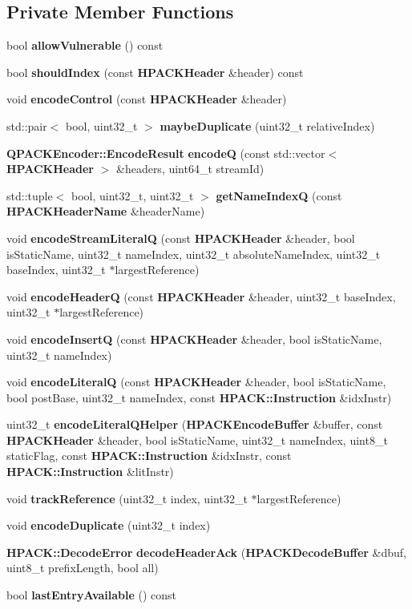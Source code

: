 \subsection*{Private Member Functions}
\begin{DoxyCompactItemize}
\item 
bool {\bf allow\+Vulnerable} () const 
\item 
bool {\bf should\+Index} (const {\bf H\+P\+A\+C\+K\+Header} \&header) const 
\item 
void {\bf encode\+Control} (const {\bf H\+P\+A\+C\+K\+Header} \&header)
\item 
std\+::pair$<$ bool, uint32\+\_\+t $>$ {\bf maybe\+Duplicate} (uint32\+\_\+t relative\+Index)
\item 
{\bf Q\+P\+A\+C\+K\+Encoder\+::\+Encode\+Result} {\bf encodeQ} (const std\+::vector$<$ {\bf H\+P\+A\+C\+K\+Header} $>$ \&headers, uint64\+\_\+t stream\+Id)
\item 
std\+::tuple$<$ bool, uint32\+\_\+t, uint32\+\_\+t $>$ {\bf get\+Name\+IndexQ} (const {\bf H\+P\+A\+C\+K\+Header\+Name} \&header\+Name)
\item 
void {\bf encode\+Stream\+LiteralQ} (const {\bf H\+P\+A\+C\+K\+Header} \&header, bool is\+Static\+Name, uint32\+\_\+t name\+Index, uint32\+\_\+t absolute\+Name\+Index, uint32\+\_\+t base\+Index, uint32\+\_\+t $\ast$largest\+Reference)
\item 
void {\bf encode\+HeaderQ} (const {\bf H\+P\+A\+C\+K\+Header} \&header, uint32\+\_\+t base\+Index, uint32\+\_\+t $\ast$largest\+Reference)
\item 
void {\bf encode\+InsertQ} (const {\bf H\+P\+A\+C\+K\+Header} \&header, bool is\+Static\+Name, uint32\+\_\+t name\+Index)
\item 
void {\bf encode\+LiteralQ} (const {\bf H\+P\+A\+C\+K\+Header} \&header, bool is\+Static\+Name, bool post\+Base, uint32\+\_\+t name\+Index, const {\bf H\+P\+A\+C\+K\+::\+Instruction} \&idx\+Instr)
\item 
uint32\+\_\+t {\bf encode\+Literal\+Q\+Helper} ({\bf H\+P\+A\+C\+K\+Encode\+Buffer} \&buffer, const {\bf H\+P\+A\+C\+K\+Header} \&header, bool is\+Static\+Name, uint32\+\_\+t name\+Index, uint8\+\_\+t static\+Flag, const {\bf H\+P\+A\+C\+K\+::\+Instruction} \&idx\+Instr, const {\bf H\+P\+A\+C\+K\+::\+Instruction} \&lit\+Instr)
\item 
void {\bf track\+Reference} (uint32\+\_\+t index, uint32\+\_\+t $\ast$largest\+Reference)
\item 
void {\bf encode\+Duplicate} (uint32\+\_\+t index)
\item 
{\bf H\+P\+A\+C\+K\+::\+Decode\+Error} {\bf decode\+Header\+Ack} ({\bf H\+P\+A\+C\+K\+Decode\+Buffer} \&dbuf, uint8\+\_\+t prefix\+Length, bool all)
\item 
bool {\bf last\+Entry\+Available} () const 
\end{DoxyCompactItemize}
